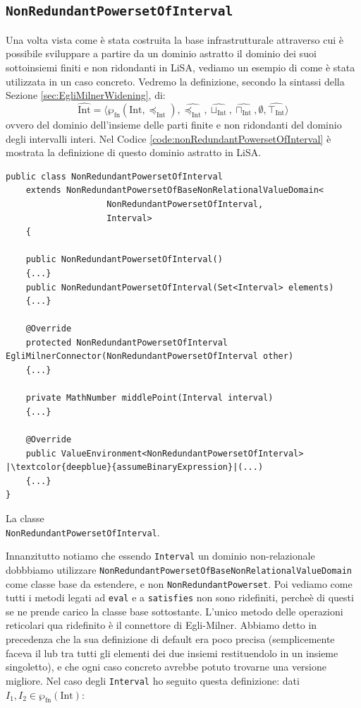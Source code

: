 \subsection{\texttt{NonRedundantPowersetOfInterval}}

Una volta vista come è stata costruita la base infrastrutturale attraverso cui è possibile sviluppare a partire da un dominio astratto il dominio dei suoi sottoinsiemi finiti e non ridondanti in LiSA, vediamo un esempio di come è stata utilizzata in un caso concreto. Vedremo la definizione, secondo la sintassi della Sezione \ref{sec:EgliMilnerWidening}, di:
\[\widehat{\textrm{Int}} = \langle \wp_{\textrm{fn}}(\textrm{Int}, \preceq_\textrm{Int}),\widehat{\preceq_{\textrm{Int}}}, \widehat{\sqcup_{\textrm{Int}}}, \widehat{\sqcap_{\textrm{Int}}}, \emptyset, \widehat{\top_{\textrm{Int}}} \rangle\]
ovvero del dominio dell'insieme delle parti finite e non ridondanti del dominio degli intervalli interi. Nel Codice \ref{code:nonRedundantPowersetOfInterval} è mostrata la definizione di questo dominio astratto in LiSA. 
\begin{algorithm}
\lstset{frame=none}
\begin{lstlisting}[belowskip=-1.1 \baselineskip, escapechar=|]
public class NonRedundantPowersetOfInterval
    extends NonRedundantPowersetOfBaseNonRelationalValueDomain<
                    NonRedundantPowersetOfInterval, 
                    Interval> 
    {

    public NonRedundantPowersetOfInterval() 
    {...}
    public NonRedundantPowersetOfInterval(Set<Interval> elements) 
    {...}
    
    @Override
    protected NonRedundantPowersetOfInterval EgliMilnerConnector(NonRedundantPowersetOfInterval other) 
    {...}
    
    private MathNumber middlePoint(Interval interval) 
    {...}
    
    @Override
    public ValueEnvironment<NonRedundantPowersetOfInterval> |\textcolor{deepblue}{assumeBinaryExpression}|(...) 
    {...}
}
\end{lstlisting}
\caption{La classe \\ \texttt{NonRedundantPowersetOfInterval}.}
\label{code:nonRedundantPowersetOfInterval}
\end{algorithm}
Innanzitutto notiamo che essendo \texttt{Interval} un dominio non-relazionale dobbbiamo utilizzare \texttt{NonRedundantPowersetOfBaseNonRelationalValueDomain} come classe base da estendere, e non \texttt{NonRedundantPowerset}. Poi vediamo come tutti i metodi legati ad \texttt{eval} e a \texttt{satisfies} non sono ridefiniti, percheè di questi se ne prende carico la classe base sottostante. L'unico metodo delle operazioni reticolari qua ridefinito è il connettore di Egli-Milner. Abbiamo detto in precedenza che la sua definizione di default era poco precisa (semplicemente faceva il lub tra tutti gli elementi dei due insiemi restituendolo in un insieme singoletto), e che ogni caso concreto avrebbe potuto trovarne una versione migliore. Nel caso degli \texttt{Interval} ho seguito questa definizione: dati \(I_1, I_2\in\wp_{\textrm{fn}}(\textrm{Int})\): 
